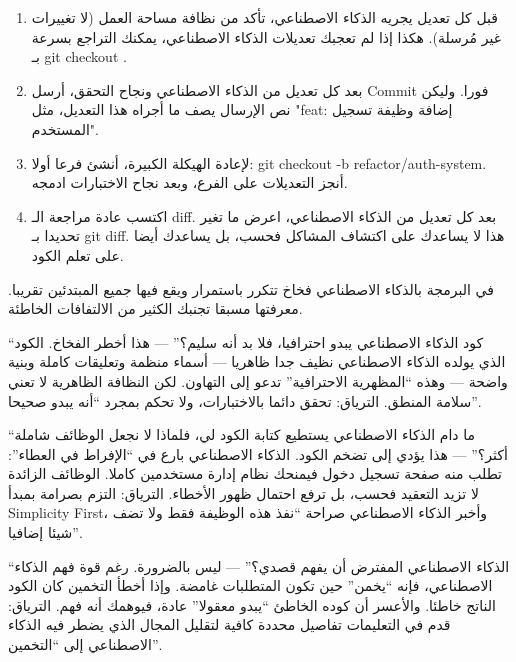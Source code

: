 \begin{enumerate}
  \item قبل كل تعديل يجريه الذكاء الاصطناعي، تأكد من نظافة مساحة العمل (لا تغييرات غير مُرسلة). هكذا إذا لم تعجبك تعديلات الذكاء الاصطناعي، يمكنك التراجع بسرعة بـ git checkout .
  \item بعد كل تعديل من الذكاء الاصطناعي ونجاح التحقق، أرسل Commit فورا. وليكن نص الإرسال يصف ما أجراه هذا التعديل، مثل "feat: إضافة وظيفة تسجيل المستخدم".
  \item لإعادة الهيكلة الكبيرة، أنشئ فرعا أولا: git checkout -b refactor/auth-system. أنجز التعديلات على الفرع، وبعد نجاح الاختبارات ادمجه.
  \item اكتسب عادة مراجعة الـ diff. بعد كل تعديل من الذكاء الاصطناعي، اعرض ما تغير تحديدا بـ git diff. هذا لا يساعدك على اكتشاف المشاكل فحسب، بل يساعدك أيضا على تعلم الكود.
\end{enumerate}


في البرمجة بالذكاء الاصطناعي فخاخ تتكرر باستمرار ويقع فيها جميع المبتدئين تقريبا. معرفتها مسبقا تجنبك الكثير من الالتفافات الخاطئة.


“كود الذكاء الاصطناعي يبدو احترافيا، فلا بد أنه سليم؟” — هذا أخطر الفخاخ. الكود الذي يولده الذكاء الاصطناعي نظيف جدا ظاهريا — أسماء منظمة وتعليقات كاملة وبنية واضحة — وهذه “المظهرية الاحترافية” تدعو إلى التهاون. لكن النظافة الظاهرية لا تعني سلامة المنطق. الترياق: تحقق دائما بالاختبارات، ولا تحكم بمجرد “أنه يبدو صحيحا”.


“ما دام الذكاء الاصطناعي يستطيع كتابة الكود لي، فلماذا لا نجعل الوظائف شاملة أكثر؟” — هذا يؤدي إلى تضخم الكود. الذكاء الاصطناعي بارع في “الإفراط في العطاء”: تطلب منه صفحة تسجيل دخول فيمنحك نظام إدارة مستخدمين كاملا. الوظائف الزائدة لا تزيد التعقيد فحسب، بل ترفع احتمال ظهور الأخطاء. الترياق: التزم بصرامة بمبدأ Simplicity First، وأخبر الذكاء الاصطناعي صراحة “نفذ هذه الوظيفة فقط ولا تضف شيئا إضافيا”.


“الذكاء الاصطناعي المفترض أن يفهم قصدي؟” — ليس بالضرورة. رغم قوة فهم الذكاء الاصطناعي، فإنه “يخمن” حين تكون المتطلبات غامضة. وإذا أخطأ التخمين كان الكود الناتج خاطئا. والأعسر أن كوده الخاطئ “يبدو معقولا” عادة، فيوهمك أنه فهم. الترياق: قدم في التعليمات تفاصيل محددة كافية لتقليل المجال الذي يضطر فيه الذكاء الاصطناعي إلى “التخمين”.

